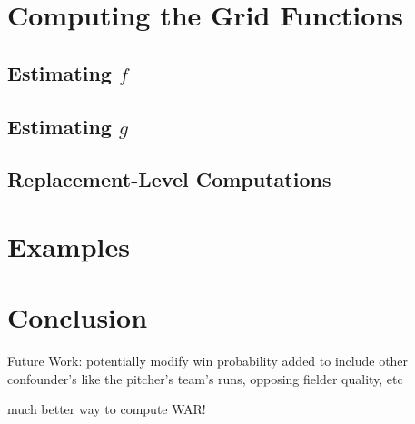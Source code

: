 \documentclass[12pt]{article}
\begin{document}




\section{Computing the Grid Functions}

\subsection{Estimating $f$}


\subsection{Estimating $g$}


\subsection{Replacement-Level Computations}



%
%



\section{Examples}



\section{Conclusion}

Future Work: potentially modify win probability added to include other confounder's like the pitcher's team's runs, opposing fielder quality, etc

much better way to compute WAR!
\end{document}
